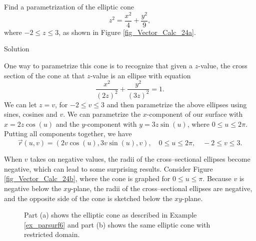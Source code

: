 \begin{example}
\label{ex_parsurf6}
Find a parametrization of the elliptic cone $$z^2 = \dfrac{x^2}{4}+\dfrac{y^2}{9},$$
where $-2\leq z\leq 3$, as shown in Figure \ref{fig_Vector_Calc_24a}.

Solution 

One way to parametrize this cone is to recognize that given a $z$-value, the cross section of the cone at that $z$-value is an ellipse with equation $$\frac{x^2}{(2z)^2} + \frac{y^2}{(3z)^2}=1.$$ We can let $z=v$, for $-2\leq v\leq 3$ and then parametrize the above ellipses using sines, cosines and $v$.  We can parametrize the $x$-component of our surface with $x=2z\cos (u)$ and the $y$-component with $y=3z\sin (u)$, where $0\leq u\leq 2\pi$. Putting all components together, we have
$$\vec r(u,v) = \left( 2v\cos (u), 3v\sin (u), v\right),\quad 0\leq u\leq 2\pi,\quad -2\leq v\leq 3.$$


When $v$ takes on negative values, the radii of the cross--sectional ellipses become negative, which can lead to some surprising results. Consider Figure \ref{fig_Vector_Calc_24b}, where the cone is graphed for $0\leq u\leq \pi$. Because $v$ is negative below the $xy$-plane, the radii of the cross--sectional ellipses are negative, and the opposite side of the cone is sketched below the $xy$-plane.

\begin{figure}[H]
\centering
\qquad
{}
\caption{Part (a) shows the elliptic cone as described in  Example \ref{ex_parsurf6} and part (b) shows the same elliptic cone with restricted domain.}
\end{figure}

\end{example}


